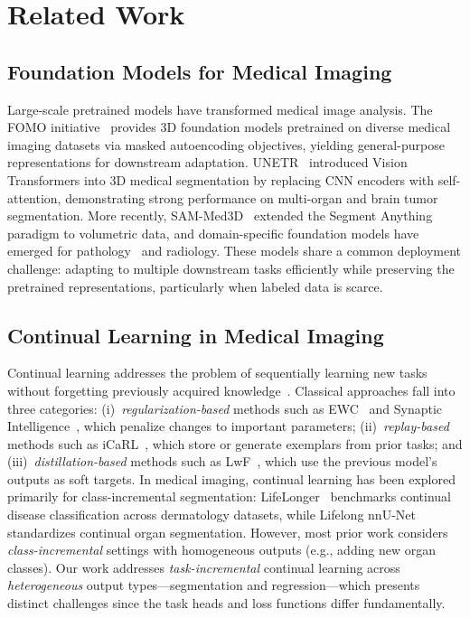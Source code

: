 \documentclass[journal,twoside,web]{ieeecolor}
\begin{document}
\section{Related Work}
\label{sec:related}

\subsection{Foundation Models for Medical Imaging}

Large-scale pretrained models have transformed medical image analysis. The FOMO initiative~\cite{fomo2025} provides 3D foundation models pretrained on diverse medical imaging datasets via masked autoencoding objectives, yielding general-purpose representations for downstream adaptation. UNETR~\cite{unetr} introduced Vision Transformers into 3D medical segmentation by replacing CNN encoders with self-attention, demonstrating strong performance on multi-organ and brain tumor segmentation. More recently, SAM-Med3D~\cite{sammed3d} extended the Segment Anything paradigm to volumetric data, and domain-specific foundation models have emerged for pathology~\cite{chen2024towards} and radiology. These models share a common deployment challenge: adapting to multiple downstream tasks efficiently while preserving the pretrained representations, particularly when labeled data is scarce.

\subsection{Continual Learning in Medical Imaging}

Continual learning addresses the problem of sequentially learning new tasks without forgetting previously acquired knowledge~\cite{mccloskey1989catastrophic}. Classical approaches fall into three categories: (i)~\emph{regularization-based} methods such as EWC~\cite{kirkpatrick2017} and Synaptic Intelligence~\cite{zenke2017continual}, which penalize changes to important parameters; (ii)~\emph{replay-based} methods such as iCaRL~\cite{rebuffi2017icarl}, which store or generate exemplars from prior tasks; and (iii)~\emph{distillation-based} methods such as LwF~\cite{li2017lwf}, which use the previous model's outputs as soft targets. In medical imaging, continual learning has been explored primarily for class-incremental segmentation: LifeLonger~\cite{derakhshani2022lifelonger} benchmarks continual disease classification across dermatology datasets, while Lifelong nnU-Net~\cite{gonzalez2023lifelong} standardizes continual organ segmentation. However, most prior work considers \emph{class-incremental} settings with homogeneous outputs (e.g., adding new organ classes). Our work addresses \emph{task-incremental} continual learning across \emph{heterogeneous} output types---segmentation and regression---which presents distinct challenges since the task heads and loss functions differ fundamentally.
\end{document}
